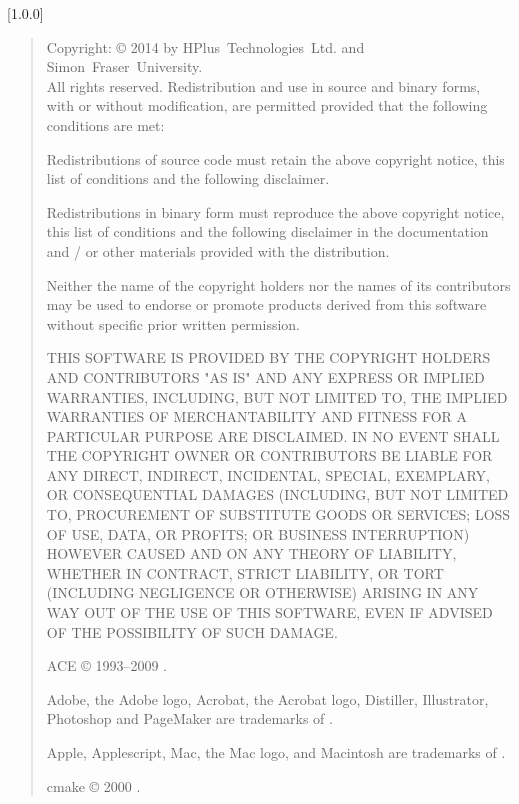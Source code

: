 [1.0.0]
\begin{quote}
\begin{small}
Copyright: \copyright{} 2014 by HPlus~Technologies~Ltd. and Simon~Fraser~University.
\\
All rights reserved. Redistribution and use in source and binary forms, with or without
modification, are permitted provided that the following conditions are met:
\begin{tightItems}
\item Redistributions of source code must retain the above copyright notice, this list of
conditions and the following disclaimer.
\item Redistributions in binary form must reproduce the above copyright notice, this list
of conditions and the following disclaimer in the documentation and / or other materials
provided with the distribution.
\item Neither the name of the copyright holders nor the names of its contributors may be
used to endorse or promote products derived from this software without specific prior
written permission.
\end{tightItems}
THIS SOFTWARE IS PROVIDED BY THE COPYRIGHT HOLDERS AND CONTRIBUTORS "AS IS" AND ANY
EXPRESS OR IMPLIED WARRANTIES, INCLUDING, BUT NOT LIMITED TO, THE IMPLIED WARRANTIES OF
MERCHANTABILITY AND FITNESS FOR A PARTICULAR PURPOSE ARE DISCLAIMED.
IN NO EVENT SHALL THE COPYRIGHT OWNER OR CONTRIBUTORS BE LIABLE FOR ANY DIRECT, INDIRECT,
INCIDENTAL, SPECIAL, EXEMPLARY, OR CONSEQUENTIAL DAMAGES (INCLUDING, BUT NOT LIMITED TO,
PROCUREMENT OF SUBSTITUTE GOODS OR SERVICES; LOSS OF USE, DATA, OR PROFITS; OR BUSINESS
INTERRUPTION) HOWEVER CAUSED AND ON ANY THEORY OF LIABILITY, WHETHER IN CONTRACT, STRICT
LIABILITY, OR TORT (INCLUDING NEGLIGENCE OR OTHERWISE) ARISING IN ANY WAY OUT OF THE USE
OF THIS SOFTWARE, EVEN IF ADVISED OF THE POSSIBILITY OF SUCH DAMAGE.

ACE \copyright{} 1993--2009
.

Adobe, the Adobe logo, Acrobat, the Acrobat logo, Distiller, Illustrator, Photoshop and
PageMaker are trademarks of
.

Apple, Applescript, Mac, the Mac logo, and Macintosh are trademarks of
.

cmake \copyright{} 2000
.


\end{small}
\end{quote}

